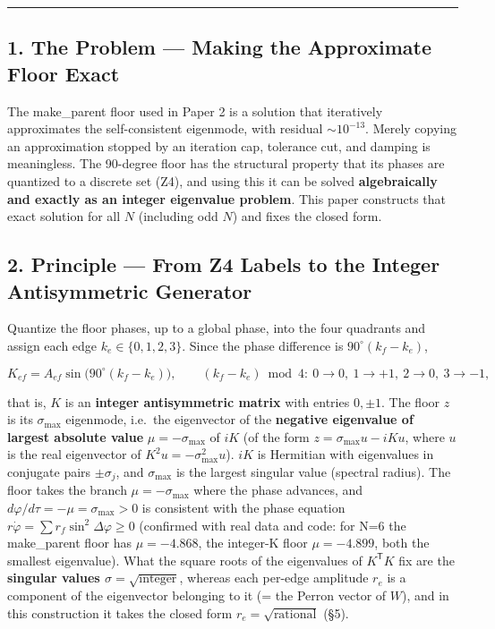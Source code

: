 \documentclass[
  a4paper,
]{ltjsarticle}
\begin{document}
\begin{center}\rule{0.5\linewidth}{0.5pt}\end{center}

\subsection{1. The Problem --- Making the Approximate Floor
Exact}\label{the-problem-making-the-approximate-floor-exact}

The make\_parent floor used in Paper 2 is a solution that iteratively
approximates the self-consistent eigenmode, with residual
\(\sim10^{-13}\). Merely copying an approximation stopped by an
iteration cap, tolerance cut, and damping is meaningless. The 90-degree
floor has the structural property that its phases are quantized to a
discrete set (Z4), and using this it can be solved \textbf{algebraically
and exactly as an integer eigenvalue problem}. This paper constructs
that exact solution for all \(N\) (including odd \(N\)) and fixes the
closed form.

\subsection{2. Principle --- From Z4 Labels to the Integer Antisymmetric
Generator}\label{principle-from-z4-labels-to-the-integer-antisymmetric-generator}

Quantize the floor phases, up to a global phase, into the four quadrants
and assign each edge \(k_e\in\{0,1,2,3\}\). Since the phase difference
is \(90^\circ(k_f-k_e)\),

\[K_{ef}=A_{ef}\sin\!\big(90^\circ(k_f-k_e)\big),\qquad (k_f-k_e)\bmod4:\ 0\to0,\ 1\to+1,\ 2\to0,\ 3\to-1,\]

that is, \(K\) is an \textbf{integer antisymmetric matrix} with entries
\(0,\pm1\). The floor \(z\) is its \(\sigma_{\max}\) eigenmode, i.e.~the
eigenvector of the \textbf{negative eigenvalue of largest absolute
value} \(\mu=-\sigma_{\max}\) of \(iK\) (of the form
\(z=\sigma_{\max}u-iKu\), where \(u\) is the real eigenvector of
\(K^2u=-\sigma_{\max}^2u\)). \(iK\) is Hermitian with eigenvalues in
conjugate pairs \(\pm\sigma_j\), and \(\sigma_{\max}\) is the largest
singular value (spectral radius). The floor takes the branch
\(\mu=-\sigma_{\max}\) where the phase advances, and
\(d\varphi/d\tau=-\mu=\sigma_{\max}>0\) is consistent with the phase
equation \(r\dot\varphi=\sum r_f\sin^2\Delta\varphi\ge0\) (confirmed
with real data and code: for N=6 the make\_parent floor has
\(\mu=-4.868\), the integer-K floor \(\mu=-4.899\), both the smallest
eigenvalue). What the square roots of the eigenvalues of
\(K^{\mathsf T}K\) fix are the \textbf{singular values
\(\sigma=\sqrt{\text{integer}}\)}, whereas each per-edge amplitude
\(r_e\) is a component of the eigenvector belonging to it (= the Perron
vector of \(W\)), and in this construction it takes the closed form
\(r_e=\sqrt{\text{rational}}\) (§5).
\end{document}
